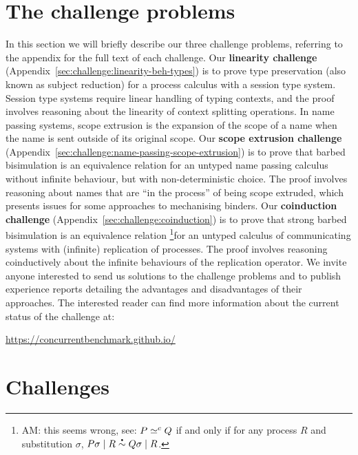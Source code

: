\documentclass[runningheads]{llncs}
\begin{document}
\section{The challenge problems}
In this section we will briefly describe our three challenge problems, referring to the appendix for the full text of each challenge.
Our \textbf{linearity challenge} (Appendix~\ref{sec:challenge:linearity-beh-types}) is to prove type preservation (also known as subject reduction) for a process calculus with a session type system.
Session type systems require linear handling of typing contexts, and the proof involves reasoning about the linearity of context splitting operations.
In name passing systems, scope extrusion is the expansion of the scope of a name when the name is sent outside of its original scope.
Our \textbf{scope extrusion challenge} (Appendix~\ref{sec:challenge:name-passing-scope-extrusion}) is to prove that barbed bisimulation is an equivalence relation for an untyped name passing calculus without infinite behaviour, but with non-deterministic choice.
The proof involves reasoning about names that are ``in the process'' of being scope extruded, which presents issues for some approaches to mechanising binders.
Our \textbf{coinduction challenge} (Appendix~\ref{sec:challenge:coinduction}) is to prove that strong barbed bisimulation is an equivalence relation \footnote{AM: this seems wrong, see:  \( P \simeq^c Q \) if and only if for any process \( R \) and substitution \( \sigma \), \( \sbbisim{\Ppar{\applysubst{\sigma}{P}}{R}}{\Ppar{\applysubst{\sigma}{Q}}{R}} \).}for an untyped calculus of communicating systems with (infinite) replication of processes.
The proof involves reasoning coinductively about the infinite behaviours of the replication operator.
We invite anyone interested to send us solutions to the challenge problems and to publish experience reports detailing the advantages and disadvantages of their approaches.
The interested reader can find more information about the current status of the challenge at:
\begin{center}
  \url{https://concurrentbenchmark.github.io/}
\end{center}


\appendix
\section{Challenges}




\end{document}
